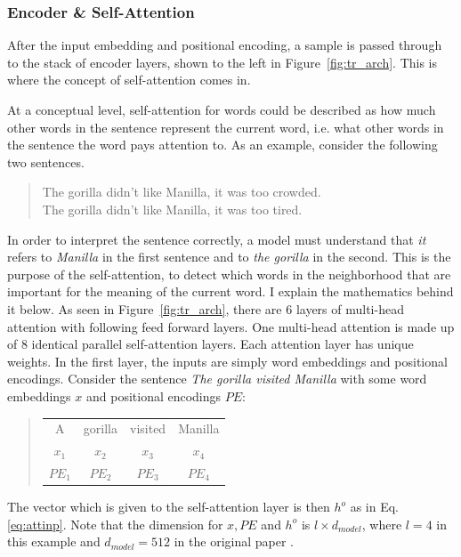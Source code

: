 \subsubsection{Encoder \& Self-Attention}

After the input embedding and positional encoding, a sample is passed through to the stack of encoder layers, shown to the left in Figure~\ref{fig:tr_arch}. This is where the concept of self-attention comes in. 

At a conceptual level, self-attention for words could be described as how much other words in the sentence represent the current word, i.e. what other words in the sentence the word pays attention to. As an example, consider the following two sentences. 

\begin{quote}
The gorilla didn't like Manilla, it was too crowded.\\
The gorilla didn't like Manilla, it was too tired.
\end{quote}

In order to interpret the sentence correctly, a model must understand that \emph{it} refers to \emph{Manilla} in the first sentence and to \emph{the gorilla} in the second. This is the purpose of the self-attention, to detect which words in the neighborhood that are important for the meaning of the current word. I explain the mathematics behind it below. 
As seen in Figure~\ref{fig:tr_arch}, there are 6 layers of multi-head attention with following feed forward layers. One multi-head attention is made up of 8 identical parallel self-attention layers. Each attention layer has unique weights. In the first layer, the inputs are simply word embeddings and positional encodings. Consider the sentence \textit{The gorilla visited Manilla} with some word embeddings $x$ and positional encodings $PE$:
\begin{quote}
\begin{tabular}{cccc}
A &gorilla &visited &Manilla\\
$x_1$&$x_2$&$x_3$&$x_4$\\
$PE_1$&$PE_2$&$PE_3$&$PE_4$\\
\end{tabular}
\end{quote}

The vector which is given to the self-attention layer is then $h^o$ as in Eq. \ref{eq:attinp}. Note that the dimension for $x, PE$ and $h^o$ is $l \times d_{model}$, where $l = 4$ in this example and $d_{model} = 512$ in the original paper \citep{NIPS2017_7181}. 

